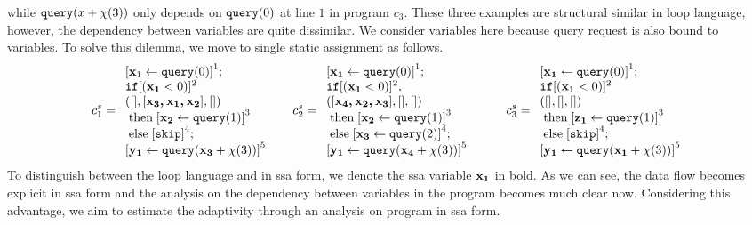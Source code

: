 \documentclass[a4paper,11pt]{article}
\begin{document}
{while ${\tt query}(x+\chi(3))$ only depends on ${\tt query}(0)$ at line $1$ in program $c_3$. 
These three examples are structural similar in loop language, however, the dependency between variables are quite dissimilar. We consider variables here because query request is also bound to variables. To solve this dilemma, we move to single static assignment as follows.   
\[
 c_1^{s} = \begin{array}{l}
      \clabel{ \assign{{\ssa{x}_1}}{\query(0)}}^{1} ; \\
      \eif  [({\ssa{x_1} }< 0 )]^{2}\\
      ([], [{ \ssa{x_3, x_1,x_2} }], []) \\
      \ethen \clabel{\assign{{\ssa{x_2}}}{\query(1)}}^{3}\\
      \eelse \clabel{\eskip}^{4} ; \\
      \clabel{\assign{{\ssa{y_1}}}{\query({\ssa{x_3} + \chi(3)})}}^{5}
 \end{array}
 ~~~~~
  c_2^{s} = \begin{array}{l}
      \clabel{ \assign{{\ssa{x_1}}}{\query(0)}}^{1} ; \\
      \eif  [({\ssa{x_1}} < 0 )]^{2}, \\
      ( [{\ssa{x_4, x_2,x_3}}], [], [] ) \\
      \ethen \clabel{\assign{{\ssa{x_2}}}{\query(1)}}^{3}\\
      \eelse \clabel{\assign{{\ssa{x_3}}}{\query(2)}}^{4} ; \\
      \clabel{\assign{{\ssa{y_1}}}{\query({\ssa{x_4}}+\chi(3))}}^{5}
 \end{array}
 ~~~~~~~~
  c_3^{s} = \begin{array}{l}
      \clabel{ \assign{{\ssa{x_1}}}{\query(0)}}^{1} ; \\
      \eif  [({\ssa{x_1}} < 0 )]^{2} \\
       ( [], [], [] ) \\
      \ethen \clabel{\assign{{\ssa{z_1}}}{\query(1)}}^{3}\\
      \eelse \clabel{\eskip}^{4} ; \\
      \clabel{\assign{{\ssa{y_1}}}{\query({\ssa{x_1}}+\chi(3))}}^{5}
 \end{array}
\]
To distinguish between the loop language and in ssa form, we denote the ssa variable ${\boldsymbol{\mathbf{x_1}}}$ in bold. As we can see, the data flow becomes explicit in ssa form and the analysis on the dependency between variables in the program becomes much clear now. Considering this advantage, we aim to estimate the adaptivity through an analysis on program in ssa form. 
}
%
\end{document}
